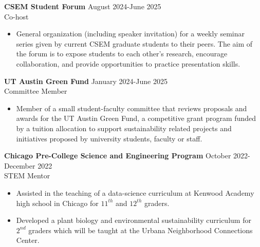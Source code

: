 \documentclass[resmargin, 10pt]{res} %
\begin{document}
\begin{resume}
{\bf CSEM Student Forum} \hfill August 2024-June 2025 \\
Co-host
\begin{itemize}[itemsep=0em]
    \item General organization (including speaker invitation) for a weekly seminar series given by current CSEM graduate students to their peers. The aim of the forum is to expose students to each other's research, encourage collaboration, and provide opportunities to practice presentation skills.
\end{itemize}

\vspace{-8pt}

{\bf UT Austin Green Fund} \hfill January 2024-June 2025 \\
Committee Member
\begin{itemize}[itemsep=0em]
    \item Member of a small student-faculty committee that reviews proposals and awards for the UT Austin Green Fund, a competitive grant program funded by a tuition allocation to support sustainability related projects and initiatives proposed by university students, faculty or staff.
\end{itemize}

\vspace{-8pt}

{\bf Chicago Pre-College Science and Engineering Program} \hfill October 2022-December 2022 \\
STEM Mentor
\begin{itemize}[itemsep=0em]
    \item Assisted in the {teaching of a data-science curriculum} at Kenwood Academy high school in Chicago for $11^{th}$ and $12^{th}$ graders. 
    \item Developed a plant biology and environmental sustainability curriculum for $2^{nd}$ graders which will be taught at the Urbana Neighborhood Connections Center.
\end{itemize}

\vspace{-8pt}


\end{resume}
\end{document}
